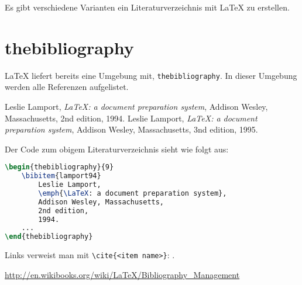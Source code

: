 \documentclass[a4paper]{article}
\begin{document}
Es gibt verschiedene Varianten ein Literaturverzeichnis mit \LaTeX{} zu
erstellen.

\tableofcontents

\section{thebibliography}
\LaTeX{} liefert bereits eine Umgebung mit, \verb+thebibliography+. In dieser
Umgebung werden alle Referenzen aufgelistet.
\begin{thebibliography}{9}
		Leslie Lamport,
		\emph{\LaTeX: a document preparation system},
		Addison Wesley, Massachusetts,
		2nd edition,
		1994.
		Leslie Lamport,
		\emph{\LaTeX: a document preparation system},
		Addison Wesley, Massachusetts,
		3nd edition,
		1995.
\end{thebibliography}

Der Code zum obigem Literaturverzeichnis sieht wie folgt aus:
\begin{lstlisting}[language=TeX, tabsize=4]
\begin{thebibliography}{9}
	\bibitem{lamport94}
		Leslie Lamport,
		\emph{\LaTeX: a document preparation system},
		Addison Wesley, Massachusetts,
		2nd edition,
		1994.
	...
\end{thebibliography}
\end{lstlisting}

Links verweist man mit \verb+\cite{<item name>}+: \cite{lamport94}.

\url{http://en.wikibooks.org/wiki/LaTeX/Bibliography_Management}
\end{document}
